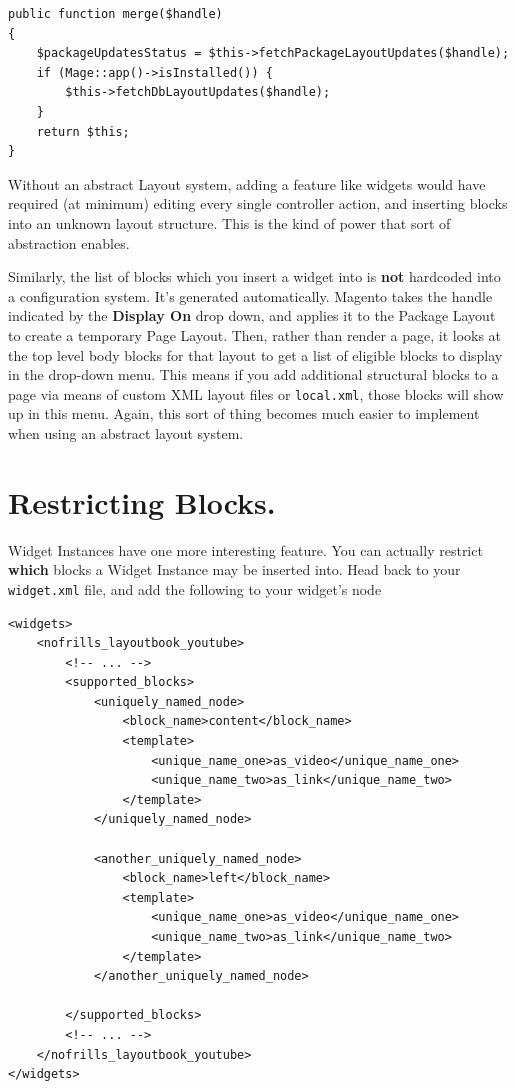 \documentclass[oneside]{book}
\begin{document}
\begin{lstlisting}
public function merge($handle)
{
    $packageUpdatesStatus = $this->fetchPackageLayoutUpdates($handle);
    if (Mage::app()->isInstalled()) {
        $this->fetchDbLayoutUpdates($handle);
    }
    return $this;
}

\end{lstlisting}


Without an abstract Layout system, adding a feature like widgets would have required (at minimum) editing every single controller action, and inserting blocks into an unknown layout structure. This is the kind of power that sort of abstraction enables.

Similarly, the list of blocks which you insert a widget into is \textbf{not} hardcoded into a configuration system.  It's generated automatically.  Magento takes the handle indicated by the \textbf{Display On} drop down, and applies it to the Package Layout to create a temporary Page Layout.  Then, rather than render a page, it looks at the top level body blocks for that layout to get a list of eligible blocks to display in the drop-down menu.  This means if you add additional structural blocks to a page via means of custom XML layout files or \footnotesize\texttt{local.xml}\normalsize, those blocks will show up in this menu.  Again, this sort of thing becomes much easier to implement when using an abstract layout system.

\section{Restricting Blocks.}

Widget Instances have one more interesting feature.  You can actually restrict \textbf{which} blocks a Widget Instance may be inserted into.  Head back to your \footnotesize\texttt{widget.xml} \normalsize  file, and add the following to  your widget's node

\begin{lstlisting}
<widgets>
    <nofrills_layoutbook_youtube>
        <!-- ... -->
        <supported_blocks>
            <uniquely_named_node>
                <block_name>content</block_name>
                <template>
                    <unique_name_one>as_video</unique_name_one>
                    <unique_name_two>as_link</unique_name_two>
                </template>
            </uniquely_named_node>

            <another_uniquely_named_node>
                <block_name>left</block_name>
                <template>
                    <unique_name_one>as_video</unique_name_one>
                    <unique_name_two>as_link</unique_name_two>
                </template>
            </another_uniquely_named_node>

        </supported_blocks>     
        <!-- ... -->
    </nofrills_layoutbook_youtube>
</widgets>

\end{lstlisting}
\end{document}
